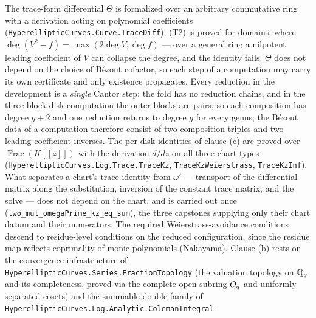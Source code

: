 \begin{remark}[Formalization]
The trace-form differential $\Theta$ is formalized over an arbitrary commutative ring
with a derivation acting on polynomial coefficients (\texttt{HyperellipticCurves.Curve.TraceDiff});
(T2) is proved for domains, where $\deg(V^2 - f) = \max(2\deg V, \deg f)$ --- over a
general ring a nilpotent leading coefficient of $V$ can collapse the degree, and the
identity fails. $\Theta$ does not depend on the choice of B\'ezout cofactor, so each
step of a computation may carry its own certificate and only existence propagates.
Every reduction in the development is a \emph{single} Cantor step: the fold has no
reduction chains, and in the three-block disk computation the outer blocks are pairs,
so each composition has degree $g+2$ and one reduction returns to degree $g$ for every
genus; the B\'ezout data of a computation therefore consist of two composition triples
and two leading-coefficient inverses. The per-disk identities of clause (c) are proved
over $\operatorname{Frac}(K[[z]])$ with the derivation $d/dz$ on all three chart types
(\texttt{HyperellipticCurves.Log.Trace.TraceKz}, \texttt{TraceKzWeierstrass},
\texttt{TraceKzInf}). What separates a chart's trace identity from $\omega'$ --- transport
of the differential matrix along the substitution, inversion of the constant trace matrix,
and the solve --- does not depend on the chart, and is carried out once
(\texttt{two\_mul\_omegaPrime\_kz\_eq\_sum}), the three capstones supplying only their
chart datum and their numerators. The required Weierstrass-avoidance conditions descend to
residue-level conditions on the reduced configuration, since the residue map reflects
coprimality of monic polynomials (Nakayama). Clause (b) rests on the convergence
infrastructure of \texttt{HyperellipticCurves.Series.FractionTopology} (the valuation
topology on $\mathbb{Q}_q$ and its completeness, proved via the complete open subring $O_q$ and
uniformly separated cosets) and the summable double family of
\texttt{HyperellipticCurves.Log.Analytic.ColemanIntegral}.
\end{remark}

